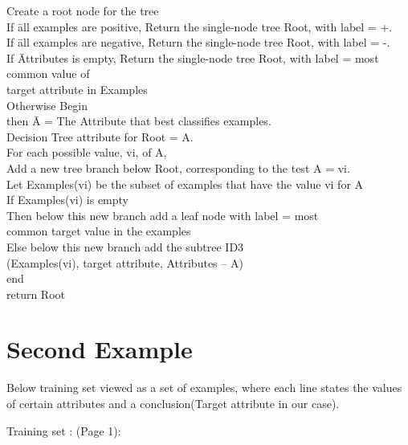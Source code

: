 \documentclass{report}
\begin{document}
\begin{tabbing}
Create a root node for the tree\\
If \= all examples are positive, Return the single-node tree Root, with label = +.\\
If \= all examples are negative, Return the single-node tree Root, with label = -.\\
If \= Attributes is empty, Return the single-node tree Root, with label = most common value of\\ target attribute in Examples\\
Otherwise Begin \\
\> then \=  A = The Attribute that best classifies examples.\\
\> Decision Tree attribute for Root = A.\\
\> For each possible value, vi, of A,\\
\> \> Add a new tree branch below Root, corresponding to the test A = vi.\\
\> \> Let Examples(vi) be the subset of examples that have the value vi for A\\
\> \> If Examples(vi) is empty\\
\> \> Then below this new branch add a leaf node with label = most\\
\> \> common target value in the examples\\
\> \> Else below this new branch add the subtree ID3 \\
\> \> (Examples(vi), target attribute, Attributes – {A})\\

end\\
return Root\\
\end{tabbing}

\section{Second Example}
Below training set viewed as a set of examples, where each line states the values of certain attributes and a conclusion(Target attribute in our case).

Training set : \cite{RuleInduction}(Page 1):
\end{document}
